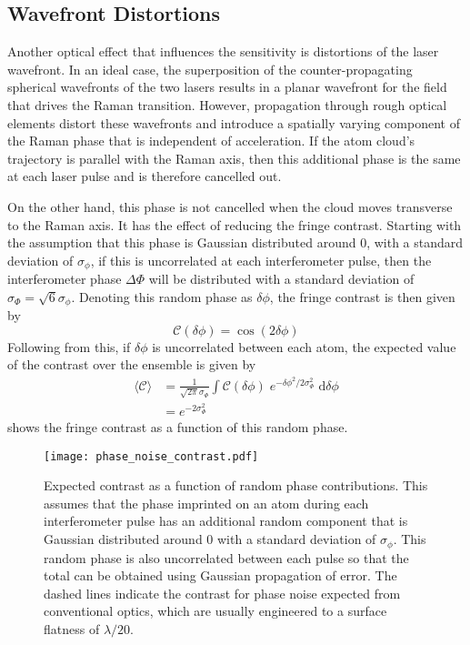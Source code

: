 \subsection{Wavefront Distortions}\label{subsec:fringe_wavefront}
Another optical effect that influences the
sensitivity is distortions of the laser wavefront. In an ideal case, the
superposition of the counter-propagating spherical wavefronts of the two lasers results in a planar
wavefront for the field that drives the Raman transition. However,
propagation through rough optical elements distort these wavefronts and
introduce a spatially varying component of the Raman phase that is independent
of acceleration. If the atom cloud's trajectory is parallel with the Raman axis,
then this additional phase is the same at each laser pulse and is therefore
cancelled out. 
\par\noindent
On the other hand, this phase is not cancelled when the cloud moves transverse to
the Raman axis. It has the effect of reducing the fringe
contrast. Starting with the assumption that this phase is Gaussian distributed
around 0, with a standard deviation of \(\sigma_\phi\), if this is uncorrelated
at each interferometer pulse, then the interferometer phase \(\Delta \Phi\) will
be distributed with a standard deviation of \(\sigma_\Phi = \sqrt{6}
\sigma_\phi\). Denoting this random phase as \(\delta\phi\), the fringe contrast
is then given by
\begin{equation}
	\mathcal{C}(\delta \phi) = \cos\left(2 \delta\phi\right)
\end{equation}
Following from this, if \( \delta \phi\) is uncorrelated between each atom, the
expected value of the contrast over the ensemble is given by
\begin{align}
	\langle \mathcal{C} \rangle & = \frac{1}{\sqrt{2\pi}\sigma_\Phi}\int \mathcal{C}(\delta \phi) \; e^{-\delta\phi^2/2\sigma_\Phi^2} \; \mathrm{d}\delta\phi \\
	                            & = e^{-2 \sigma_\Phi^2}
\end{align}
 shows the fringe contrast as a
function of this random phase. 
\begin{figure}[htbp]
	\centering
	\texttt{[image: phase\_noise\_contrast.pdf]}
  \caption[Expected fringe contrast as a function of random phase
  contributions.]{Expected contrast as a function of random phase contributions. This
		assumes that the phase imprinted on an atom during each interferometer pulse
		has an additional random component that is Gaussian distributed around 0
		with a standard deviation of \(\sigma_\phi\). This random phase is also
		uncorrelated between each pulse so that the total can be obtained using
		Gaussian propagation of error. The dashed lines indicate the contrast for
		phase noise expected from conventional optics, which are usually engineered
		to a surface flatness of \(\lambda/20\).}
	\label{fig:raman_phasenoise}
\end{figure}
